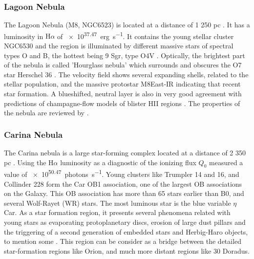 \documentclass[fleqn,usenatbib, useAMS, a4paper]{mnras}
\newcommand\ha{\ensuremath{\text{H}\alpha}}
\begin{document}
\subsubsection{Lagoon Nebula}
\label{sec:lagoon-nebula}

The Lagoon Nebula (M8, NGC6523) is located at a distance of 1 250 pc \citetext{\SI{1}{\arcsecond} = \SI{0.006}{pc} ; \citealp{2005A&A...430..941P}}.
It has a luminosity in \ha{} of \SI{e37.47}{erg.s^{-1}}\citep{1984ApJ...287..116K}.
It contains the young stellar cluster NGC6530 and the region is illuminated by different massive stars of spectral types O and B, the hottest being 9 Sgr, type O4V \citep{Damiani:2017b}.
Optically, the brightest part of the nebula is called 'Hourglass nebula' which surrounds and obscures the O7 star Herschel 36 \citep{1986AJ.....91..870W}. 
The velocity field shows several expanding shells, related to the stellar population, and the massive protostar M8East-IR \citep{1984ApJ...278..170S} indicating that recent star formation. 
A blueshifted, neutral layer is also in very good agreement with predictions of champagne-flow models of blister HII regions \citep{Damiani:2017b}. 
The properties of the nebula are reviewed by \citet{2008hsf2.book..533T}.

\subsubsection{Carina Nebula}
\label{sec:carina-nebula}

The Carina nebula is a large star-forming complex located at a distance of 2 350 pc \citetext{\SI{1}{\arcsecond} = \SI{0.01}{pc} ; \citealp{2006ApJ...644.1151S}}.
Using the \ha{} luminosity as a diagnostic of the ionizing flux \(Q_0\) \citet{2007MNRAS.379.1279S} measured a value of \SI{e50.47}{photons.s^{-1}}.
Young clusters like Trumpler 14 and 16, and Collinder 228 form the Car OB1 association, one of the largest OB associations on the Galaxy.
This OB association has more than 65 stars earlier than B0, and several Wolf-Rayet (WR) stars.
The most luminous star is the blue variable $\eta$ Car.
As a star formation region, it presents several phenomena related with young stars as evaporating protoplanetary discs, erosion of large dust pillars and the triggering of a second generation of embedded stars and Herbig-Haro objects, to mention some \citetext{see \citealp{2008hsf2.book..138S} and reference therein}. 
This region can be consider as a bridge between the detailed star-formation regions like Orion, and much more distant regions like 30 Doradus.
 
\end{document}
